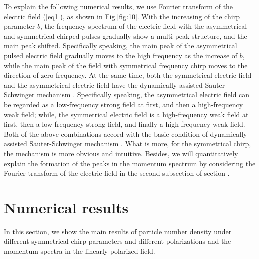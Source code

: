 \documentclass[aps,preprint,superscriptaddress]{revtex4}
\begin{document}
To explain the following numerical results, we use Fourier transform of the electric field (\ref{eq1}), as shown in Fig.\ref{fig:10}. With the increasing of the chirp parameter $b$, the frequency spectrum of the electric field with the asymmetrical and symmetrical chirped pulses gradually show a multi-peak structure, and the main peak shifted. Specifically speaking, the main peak of the asymmetrical pulsed electric field gradually moves to the high frequency as the increase of $b$, while the main peak of the field with symmetrical frequency chirp moves to the direction of zero frequency. At the same time, both the symmetrical electric field and the asymmetrical electric field have the dynamically assisted Sauter-Schwinger mechanism \cite{Li:2014pp,Schutzhold:2008pz,Abdukerim:2012ke}. Specifically speaking, the asymmetrical electric field can be regarded as a low-frequency strong field at first, and then a high-frequency weak field; while, the symmetrical electric field is a high-frequency weak field at first, then a low-frequency strong field, and finally a high-frequency weak field. Both of the above combinations accord with the basic condition of dynamically assisted Sauter-Schwinger mechanism \cite{Li:2014pp,Schutzhold:2008pz,Abdukerim:2012ke}. What is more, for the symmetrical chirp, the mechanism is more obvious and intuitive. Besides, we will quantitatively explain the formation of the peaks in the momentum spectrum by considering the Fourier transform of the electric field in the second subsection of section \uppercase\expandafter{}.


\section{Numerical results}\label{result1}
In this section, we show the main results of particle number density under different symmetrical chirp parameters and different polarizations and the momentum spectra in the linearly polarized field.
\end{document}
